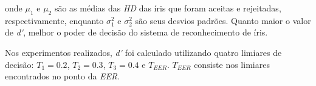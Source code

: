 
\noindent onde $\mu_{1}$ e $\mu_{2}$ são as médias das \textit{\acrlong{HD}} das íris que foram aceitas e rejeitadas, respectivamente, enquanto $\sigma_{1}^2$ e $\sigma_{2}^2$ são seus desvios padrões. Quanto maior o valor de \textit{\acrshort{d'}}, melhor o poder de decisão do sistema de reconhecimento de íris.

\par Nos experimentos realizados, \textit{\acrshort{d'}} foi calculado utilizando quatro limiares de decisão: $T_{1} = 0.2$, $T_{2} = 0.3$, $T_{3} = 0.4$ e $T_{EER}$. $T_{EER}$ consiste nos limiares encontrados no ponto da \textit{\acrshort{EER}}.



